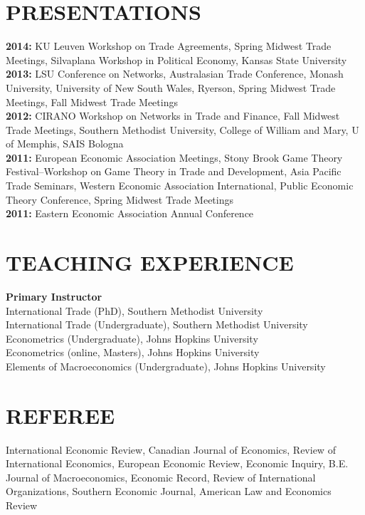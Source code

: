\documentclass[11pt]{res}
\begin{document}
\begin{resume}
\section{PRESENTATIONS}\vspace{1.5mm}
{\bf 2014:} KU Leuven Workshop on Trade Agreements, Spring Midwest Trade Meetings, Silvaplana Workshop in Political Economy, Kansas State University\vspace{1.5mm}\\
{\bf 2013:} LSU Conference on Networks, Australasian Trade Conference, Monash University, University of New South Wales, Ryerson, Spring Midwest Trade Meetings, Fall Midwest Trade Meetings\vspace{1.5mm}\\
{\bf 2012:}  CIRANO Workshop on Networks in Trade and Finance, Fall Midwest Trade Meetings, Southern Methodist University, College of William and Mary, U of Memphis, SAIS Bologna\vspace{1.5mm}\\
{\bf 2011:} European Economic Association Meetings, Stony Brook Game Theory Festival--Workshop on Game Theory in Trade and Development, Asia Pacific Trade Seminars, Western Economic Association International, Public Economic Theory Conference, Spring Midwest Trade Meetings\vspace{1.5mm}\\
 {\bf 2011:} Eastern Economic Association Annual Conference \vspace{1.5mm}\\

\section{TEACHING EXPERIENCE} \vspace{1.5mm}
{\bf Primary Instructor}\vspace{1.5mm}\\
International Trade (PhD), Southern Methodist University\vspace{1.5mm}\\
International Trade (Undergraduate), Southern Methodist University\vspace{1.5mm}\\
Econometrics (Undergraduate), Johns Hopkins University\vspace{1.5mm}\\
Econometrics (online, Masters), Johns Hopkins University\vspace{1.5mm}\\
Elements of Macroeconomics (Undergraduate), Johns Hopkins University\vspace{1.5mm}\\

\section{REFEREE} \vspace{1.5mm}
International Economic Review, Canadian Journal of Economics, Review of International Economics, European Economic Review, Economic Inquiry, B.E. Journal of Macroeconomics, Economic Record, Review of International Organizations, Southern Economic Journal, American Law and Economics Review
\end{resume}
\end{document}
